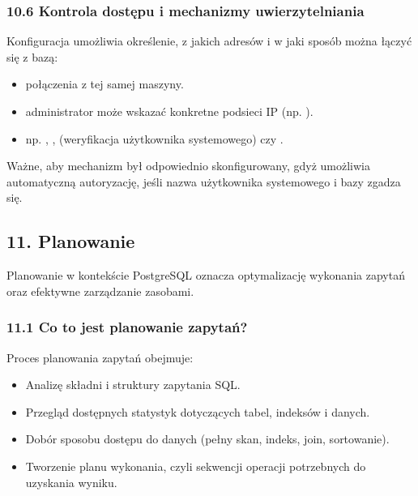 \documentclass[letterpaper,10pt,polish]{sphinxmanual}
\begin{document}
\subsubsection{10.6 Kontrola dostępu i mechanizmy uwierzytelniania}
\label{\detokenize{rozdzial2/Konfiguracja_baz_danych/Konfiguracja_baz_danych:kontrola-dostepu-i-mechanizmy-uwierzytelniania}}
\sphinxAtStartPar
Konfiguracja umożliwia określenie, z jakich adresów i w jaki sposób można łączyć się z bazą:
\begin{itemize}
\item {} 
\sphinxAtStartPar
{} \textendash{} połączenia z tej samej maszyny.

\item {} 
\sphinxAtStartPar
{} \textendash{} administrator może wskazać konkretne podsieci IP (np. ).

\item {} 
\sphinxAtStartPar
{} \textendash{} np. , ,  (weryfikacja użytkownika systemowego) czy .

\end{itemize}

\sphinxAtStartPar
Ważne, aby mechanizm  był odpowiednio skonfigurowany, gdyż umożliwia automatyczną autoryzację, jeśli nazwa użytkownika systemowego i bazy zgadza się.


\subsection{11. Planowanie}
\label{\detokenize{rozdzial2/Konfiguracja_baz_danych/Konfiguracja_baz_danych:planowanie}}
\sphinxAtStartPar
Planowanie w kontekście PostgreSQL oznacza optymalizację wykonania zapytań oraz efektywne zarządzanie zasobami.


\subsubsection{11.1 Co to jest planowanie zapytań?}
\label{\detokenize{rozdzial2/Konfiguracja_baz_danych/Konfiguracja_baz_danych:co-to-jest-planowanie-zapytan}}
\sphinxAtStartPar
Proces planowania zapytań obejmuje:
\begin{itemize}
\item {} 
\sphinxAtStartPar
Analizę składni i struktury zapytania SQL.

\item {} 
\sphinxAtStartPar
Przegląd dostępnych statystyk dotyczących tabel, indeksów i danych.

\item {} 
\sphinxAtStartPar
Dobór sposobu dostępu do danych (pełny skan, indeks, join, sortowanie).

\item {} 
\sphinxAtStartPar
Tworzenie planu wykonania, czyli sekwencji operacji potrzebnych do uzyskania wyniku.

\end{itemize}
\end{document}
